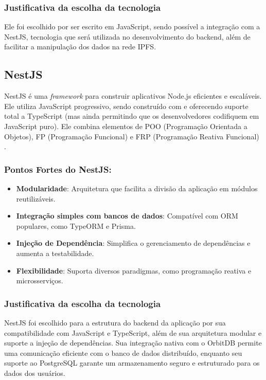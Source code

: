\subsubsection{Justificativa da escolha da tecnologia}
Ele foi escolhido por ser escrito em JavaScript, sendo possível a integração com a NestJS, tecnologia que será utilizada no desenvolvimento do backend, além de facilitar a manipulação dos dados na rede IPFS.

\subsection{NestJS}

NestJS é uma \textit{framework} para construir aplicativos Node.js eficientes e escaláveis. Ele utiliza JavaScript progressivo, sendo construído com e oferecendo suporte total a TypeScript (mas ainda permitindo que os desenvolvedores codifiquem em JavaScript puro). Ele combina elementos de POO (Programação Orientada a Objetos), FP (Programação Funcional) e FRP (Programação Reativa Funcional) \cite{nestjs2025}.

\subsubsection*{Pontos Fortes do NestJS:}
\begin{itemize}
    \item \textbf{Modularidade}: Arquitetura que facilita a divisão da aplicação em módulos reutilizáveis.
    \item \textbf{Integração simples com bancos de dados}: Compatível com ORM populares, como TypeORM e Prisma.
    \item \textbf{Injeção de Dependência}: Simplifica o gerenciamento de dependências e aumenta a testabilidade.
    \item \textbf{Flexibilidade}: Suporta diversos paradigmas, como programação reativa e microsserviços.
\end{itemize}

\subsubsection{Justificativa da escolha da tecnologia}
NestJS foi escolhido para a estrutura do backend da aplicação por sua compatibilidade com JavaScript e TypeScript, além de sua arquitetura modular e suporte a injeção de dependências. Sua integração nativa com o OrbitDB permite uma comunicação eficiente com o banco de dados distribuído, enquanto seu suporte ao PostgreSQL garante um armazenamento seguro e estruturado para os dados dos usuários.

